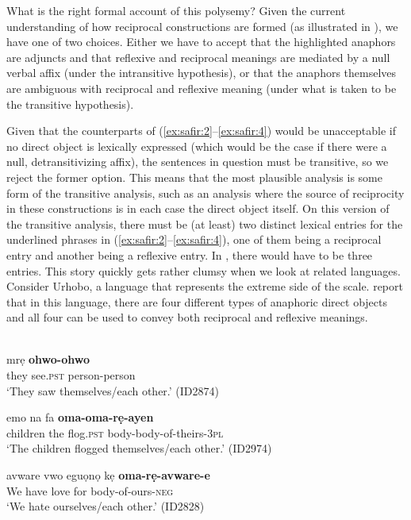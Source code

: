 \documentclass[output=paper]{langsci/langscibook}
\begin{document}
What is the right formal account of this polysemy? Given the current understanding of how reciprocal constructions are formed (as illustrated in ), we have one of two choices. Either we have to accept that the highlighted anaphors are adjuncts and that reflexive and reciprocal meanings are mediated by a null verbal affix (under the intransitive hypothesis), or that the anaphors themselves are ambiguous with reciprocal and reflexive meaning (under what is taken to be the transitive hypothesis). 

Given that the counterparts of (\ref{ex:safir:2}--\ref{ex:safir:4}) would be unacceptable if no direct object is lexically expressed (which would be the case if there were a null, detransitivizing affix), the sentences in question must be transitive, so we reject the former option. This means that the most plausible analysis is some form of the transitive analysis, such as an analysis where the source of reciprocity in these constructions is in each case the direct object itself. On this version of the transitive analysis, there must be (at least) two distinct lexical entries for the underlined phrases in (\ref{ex:safir:2}--\ref{ex:safir:4}), one of them being a reciprocal entry and another being a reflexive entry. In , there would have to be three entries. This story quickly gets rather clumsy when we look at related languages. Consider Urhobo, a language that represents the extreme side of the scale. \citet{AzizaSafir2006} report that in this language, there are four different types of anaphoric direct objects and all four can be used to convey both reciprocal and reflexive meanings. 


\ea\label{ex:safir:5}
 \\
  \ea\label{ex:safir:5a}
     {mrẹ}     \textbf{{ohwo-ohwo}} \\
	they   see.\textsc{pst}   person-person \\
  \glt   ‘They saw themselves/each other.’ (ID2874)

  \ex\label{ex:safir:5b}
  \gll emo    na  fa    \textbf{{oma-oma-rẹ-ayen}}\\
  children  the  flog.\textsc{pst}  body-body-of-theirs-\textsc{3pl}\\
  \glt   ‘The children flogged themselves/each other.’ (ID2974)

  \ex\label{ex:safir:5c}
  \gll avware   vwo  eguọnọ   kẹ   \textbf{oma-rẹ-avware-e}\\
	We     have   love     for   body-of-ours-\textsc{neg}  \\
  \glt   ‘We hate ourselves/each other.’  (ID2828)
\end{document}
